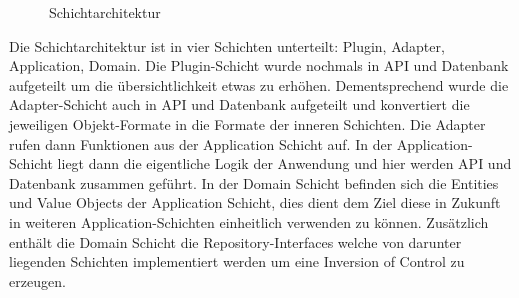 \begin{figure}[htbp]
    \centering
    \caption{\label{flutter-1} Schichtarchitektur}
\end{figure}

Die Schichtarchitektur ist in vier Schichten unterteilt: Plugin, Adapter, Application, Domain.
Die Plugin-Schicht wurde nochmals in API und Datenbank aufgeteilt um die übersichtlichkeit etwas zu erhöhen.
Dementsprechend wurde die Adapter-Schicht auch in API und Datenbank aufgeteilt und konvertiert die jeweiligen Objekt-Formate in die Formate der inneren Schichten.
Die Adapter rufen dann Funktionen aus der Application Schicht auf.
In der Application-Schicht liegt dann die eigentliche Logik der Anwendung und hier werden API und Datenbank zusammen geführt.
In der Domain Schicht befinden sich die Entities und Value Objects der Application Schicht,
dies dient dem Ziel diese in Zukunft in weiteren Application-Schichten einheitlich verwenden zu können.
Zusätzlich enthält die Domain Schicht die Repository-Interfaces welche von darunter liegenden Schichten implementiert werden um eine Inversion of Control zu erzeugen.

